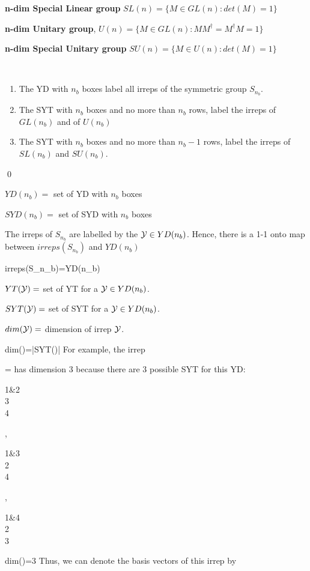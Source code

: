 {\bf n-dim Special Linear group} $SL(n)=\{ M\in GL(n):
det(M)=1\}$

{\bf n-dim Unitary group}, $U(n)=\{ M\in GL(n):
M M^\dagger =M^\dagger M =1\}$

{\bf n-dim Special Unitary group}
$SU(n)=\{ M\in U(n):
det(M)=1\}$


\begin{claim}\
\begin{enumerate}
\item
The YD with $n_b$ boxes label all irreps of the symmetric group 
$S_{n_b}$.

\item
The SYT with $n_b$ boxes and no more than $n_b$ rows,
label the irreps of $GL(n_b)$ and of $U(n_b)$
\item
The SYT with $n_b$ boxes and
no more than $n_b-1$
rows, label the irreps of $SL(n_b)$ and $SU(n_b)$.
\end{enumerate}
\end{claim}
\proof
\qed



$YD(n_b)=$ set of YD with $n_b$ boxes

$SYD(n_b)=$ set of SYD with $n_b$ boxes

The irreps of $S_{n_b}$  are labelled by the ${\cal Y}\in YD(n_b)$. 
Hence, there is a 1-1 onto map between $irreps(S_{n_b})$ and $YD(n_b)$


\beq
irreps(S_{n_b})=YD(n_b)
\eeq

$YT({\cal Y})=$ set of YT for a ${\cal Y}\in YD(n_b)$.

$SYT({\cal Y})=$ set of SYT for a ${\cal Y}\in YD(n_b)$.


$dim({\cal Y})=$ dimension of irrep ${\cal Y}$.

\beq
dim(\caly)=|SYT(\caly)|
\eeq
For example, the 
irrep 

\beq
\caly=
\eeq
has dimension 3 because there are 3 possible SYT for this YD:

\beq
\begin{ytableau}
1&2
\\
3
\\
4
\end{ytableau}
,\quad
\begin{ytableau}
1&3
\\
2
\\
4
\end{ytableau}
,\quad
\begin{ytableau}
1&4
\\
2
\\
3
\end{ytableau}
\implies dim(\caly)=3
\eeq
Thus, we can denote the
basis vectors of this irrep by

